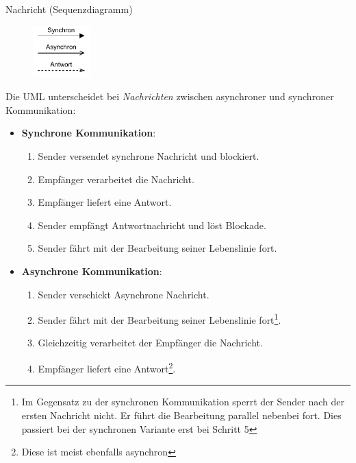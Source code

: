 \begin{diag}{Nachricht (Sequenzdiagramm)}
    \begin{figure}
        \centering
        \includegraphics[width=0.2\textwidth]{includes/figures/defi_diagrams_sequenz_message.pdf}
    \end{figure}
    Die UML unterscheidet bei \emph{Nachrichten} zwischen asynchroner und synchroner Kommunikation:
    \begin{itemize}
        \item \textbf{Synchrone Kommunikation}:
              \begin{enumerate}
                  \item Sender versendet synchrone Nachricht und blockiert.
                  \item Empfänger verarbeitet die Nachricht.
                  \item Empfänger liefert eine Antwort.
                  \item Sender empfängt Antwortnachricht und löst Blockade.
                  \item Sender fährt mit der Bearbeitung seiner Lebenslinie fort.
              \end{enumerate}
        \item \textbf{Asynchrone Kommunikation}:
              \begin{enumerate}
                  \item Sender verschickt Asynchrone Nachricht.
                  \item Sender fährt mit der Bearbeitung seiner Lebenslinie fort\footnote{
                            Im Gegensatz zu der synchronen Kommunikation sperrt der Sender nach der ersten Nachricht nicht.
                            Er führt die Bearbeitung parallel nebenbei fort.
                            Dies passiert bei der synchronen Variante erst bei Schritt 5
                        }.
                  \item Gleichzeitig verarbeitet der Empfänger die Nachricht.
                  \item Empfänger liefert eine Antwort\footnote{Diese ist meist ebenfalls asynchron}.
              \end{enumerate}
    \end{itemize}


\end{diag}
